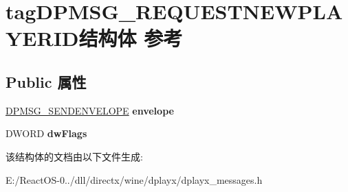 \hypertarget{structtag_d_p_m_s_g___r_e_q_u_e_s_t_n_e_w_p_l_a_y_e_r_i_d}{}\section{tag\+D\+P\+M\+S\+G\+\_\+\+R\+E\+Q\+U\+E\+S\+T\+N\+E\+W\+P\+L\+A\+Y\+E\+R\+I\+D结构体 参考}
\label{structtag_d_p_m_s_g___r_e_q_u_e_s_t_n_e_w_p_l_a_y_e_r_i_d}
\subsection*{Public 属性}
\begin{DoxyCompactItemize}
\item 
\mbox{\label{structtag_d_p_m_s_g___r_e_q_u_e_s_t_n_e_w_p_l_a_y_e_r_i_d_a64df050b3138b1532a3e09c14acc002c}} 
\hyperlink{structtag_d_p_m_s_g___s_e_n_d_e_n_v_e_l_o_p_e}{D\+P\+M\+S\+G\+\_\+\+S\+E\+N\+D\+E\+N\+V\+E\+L\+O\+PE} {\bfseries envelope}
\item 
\mbox{\label{structtag_d_p_m_s_g___r_e_q_u_e_s_t_n_e_w_p_l_a_y_e_r_i_d_a8ddeb9e7702ede996a80bdee7c4d6345}} 
D\+W\+O\+RD {\bfseries dw\+Flags}
\end{DoxyCompactItemize}


该结构体的文档由以下文件生成\+:\begin{DoxyCompactItemize}
\item 
E\+:/\+React\+O\+S-\/0../dll/directx/wine/dplayx/dplayx\+\_\+messages.\+h\end{DoxyCompactItemize}

